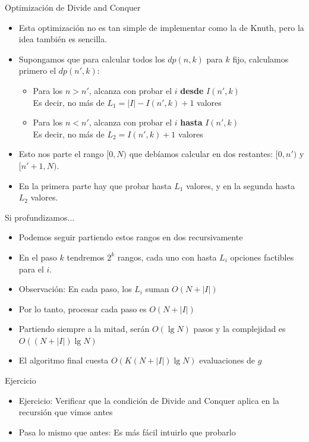 \documentclass{beamer}
\begin{document}
\begin{frame}{Optimización de Divide and Conquer}
    \begin{itemize}
		\item Esta optimización no es tan simple de implementar como la de Knuth, pero la idea también es sencilla.
		\item Supongamos que para calcular todos los $dp(n,k)$ para $k$ fijo, calculamos primero el $dp(n',k)$:
			\begin{itemize}
				\item Para los $n > n'$, alcanza con probar el $i$ \textbf{desde} $I(n',k)$ \\
						Es decir, no más de $L_1 = |I| - I(n',k) + 1$ valores
				\item Para los $n < n'$, alcanza con probar el $i$ \textbf{hasta} $I(n',k)$ \\
				        Es decir, no más de $L_2 = I(n',k) + 1$ valores
			\end{itemize}
		\item Esto nos parte el rango $[0,N)$ que debíamos calcular en dos restantes: $[0,n')$ y $[n'+1,N)$.
		\item En la primera parte hay que probar hasta $L_1$ valores, y en la segunda hasta $L_2$ valores.
    \end{itemize}
\end{frame}

\begin{frame}{Si profundizamos...}
    \begin{itemize}
		\item Podemos seguir partiendo estos rangos en dos recursivamente
		\item En el paso $k$ tendremos $2^k$ rangos, cada uno con hasta $L_i$ opciones factibles para el $i$.
		\item Observación: En cada paso, los $L_i$ suman $O(N + |I|)$
		\item Por lo tanto, procesar cada paso es $O(N + |I|)$
		\item Partiendo siempre a la mitad, serán $O(\lg N)$ pasos y la complejidad es $O((N + |I|) \lg N)$
		\item El algoritmo final cuesta $O(K(N+|I|)\lg N)$ evaluaciones de $g$
    \end{itemize}
\end{frame}



\begin{frame}{Ejercicio}
    \begin{itemize}
		\item Ejercicio: Verificar que la condición de Divide and Conquer aplica en la recursión que vimos antes 
		\item Pasa lo mismo que antes: Es más fácil intuirlo que probarlo
    \end{itemize}
\end{frame}
\end{document}
